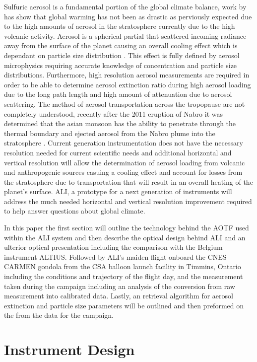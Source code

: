 \documentclass[12pt]{article}
\begin{document}
Sulfuric aerosol is a fundamental portion of the global climate balance, work by \cite{Andreae2005} has show that global warming has not been as drastic as perviously expected due to the high amounts of aerosol in the stratosphere currently due to the high volcanic activity. Aerosol is a spherical partial that scattered incoming radiance away from the surface of the planet causing an overall cooling effect which is dependant on particle size distribution \citep{Kiehl1993}. This effect is fully defined by aerosol microphysics requiring accurate knowledge of concentration and particle size distributions. Furthermore, high resolution aerosol measurements are required in order to be able to determine aerosol extinction ratio during high aerosol loading due to the long path length and high amount of attenuation due to aerosol scattering. The method of aerosol transportation across the tropopause are not completely understood, recently after the 2011 eruption of Nabro it was determined that the asian monsoon has the ability to penetrate through the thermal boundary and ejected aerosol from the Nabro plume into the stratosphere \citep{Bourassa2012c}. Current generation instrumentation does not have the necessary resolution needed for current scientific needs and additional horizontal and vertical resolution will allow the determination of aerosol loading from volcanic and anthropogenic sources casuing a cooling effect  and account for losses from the stratosphere due to transportation that will result in an overall heating of the planet's surface. ALI, a prototype for a next generation of instruments will address the much needed horizontal and vertical resolution improvement required to help answer questions about global climate.

In this paper the first section will outline the technology behind the AOTF used within the ALI system and then describe the optical design behind ALI and an ulterior optical presentation including the comparison with the Belgium instrument ALTIUS. Followed by ALI's maiden flight onboard the CNES CARMEN gondola from the CSA balloon launch facility in Timmins, Ontario including the conditions and trajectory of the flight day, and the measurement taken during the campaign including an analysis of the conversion from raw measurement into calibrated data. Lastly, an retrieval algorithm for aerosol extinction and particle size parameters will be outlined and then preformed on the from the data for the campaign.

\section{Instrument Design}
\end{document}
